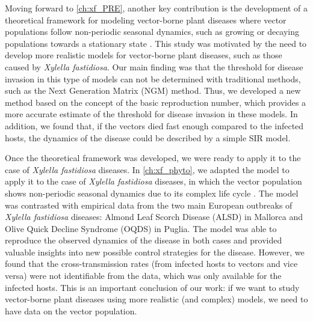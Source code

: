 Moving forward to \cref{ch:xf_PRE}, another key contribution is the
development of a theoretical framework for modeling vector-borne plant diseases
where vector populations follow non-periodic seasonal dynamics, such as growing
or decaying populations towards a stationary state
\cite{GimenezRomero2022_PRE}. This study was motivated by the need to develop
more realistic models for vector-borne plant diseases, such as those caused by
\textit{Xylella fastidiosa}. Our main finding was that the threshold for
disease invasion in this type of models can not be determined with traditional
methods, such as the Next Generation Matrix (NGM) method. Thus, we developed a
new method based on the concept of the basic reproduction number, which
provides a more accurate estimate of the threshold for disease invasion in
these models. In addition, we found that, if the vectors died fast enough
compared to the infected hosts, the dynamics of the disease could be described
by a simple SIR model.

Once the theoretical framework was developed, we were ready to apply it to the
case of \textit{Xylella fastidiosa} diseases. In \cref{ch:xf_phyto}, we adapted
the model to apply it to the case of \textit{Xylella fastidiosa} diseases, in
which the vector population shows non-periodic seasonal dynamics due to its
complex life cycle \cite{GimenezRomero2023}. The model was contrasted with
empirical data from the two main European outbreaks of \textit{Xylella
    fastidiosa} diseases: Almond Leaf Scorch Disease (ALSD) in Mallorca and
Olive Quick Decline Syndrome (OQDS) in Puglia. The model was able to reproduce
the observed dynamics of the disease in both cases and provided valuable
insights into new possible control strategies for the disease. However, we
found that the cross-transmission rates (from infected hosts to vectors and
vice versa) were not identifiable from the data, which was only available for
the infected hosts. This is an important conclusion of our work: if we want to
study vector-borne plant diseases using more realistic (and complex) models, we
need to have data on the vector population.

